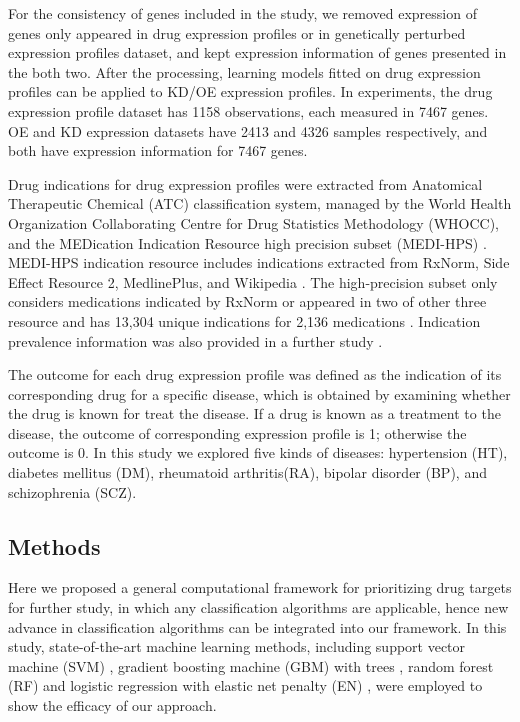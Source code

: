    For the consistency of genes included in the study, we removed expression of genes only appeared in drug expression profiles or in genetically perturbed expression profiles dataset, and kept expression information of genes presented in the both two. After the processing, learning models fitted on drug expression profiles can be applied to KD/OE expression profiles. In experiments, the drug expression profile dataset has 1158 observations, each measured in 7467 genes. OE and KD expression datasets have 2413 and 4326 samples respectively, and both have expression information for 7467 genes.

    Drug indications for drug expression profiles were extracted from Anatomical Therapeutic Chemical (ATC) classification system, managed by the World Health Organization Collaborating Centre for Drug Statistics Methodology (WHOCC), and the MEDication Indication Resource high precision subset (MEDI-HPS) \cite{wei2013development}. MEDI-HPS indication resource includes indications extracted from RxNorm, Side Effect Resource 2, MedlinePlus, and Wikipedia \cite{wei2013development}. The high-precision subset only considers medications indicated by RxNorm or appeared in two of other three resource and has 13,304 unique indications for 2,136 medications \cite{wei2013development}. Indication prevalence information was also provided in a further study \cite{wei2013validation}. 

    The outcome for each drug expression profile was defined as the indication of its corresponding drug for a specific disease, which is obtained by examining whether the drug is known for treat the disease. If a drug is known as a treatment to the disease, the outcome of corresponding expression profile is 1; otherwise the outcome is 0. In this study we explored five kinds of diseases: hypertension (HT), diabetes mellitus (DM), rheumatoid arthritis(RA), bipolar disorder (BP), and schizophrenia (SCZ).
    
  \subsection{Methods}
    Here we proposed a general computational framework for prioritizing drug targets for further study, in which any classification algorithms are applicable, hence new advance in classification algorithms can be integrated into our framework. In this study, state-of-the-art machine learning methods, including support vector machine (SVM) \cite{cortes1995support}, gradient boosting machine (GBM) with trees \cite{friedman2001greedy}, random forest (RF) \cite{breiman2001random} and logistic regression with elastic net penalty (EN) \cite{zou2005regularization}, were employed to show the efficacy of our approach.

